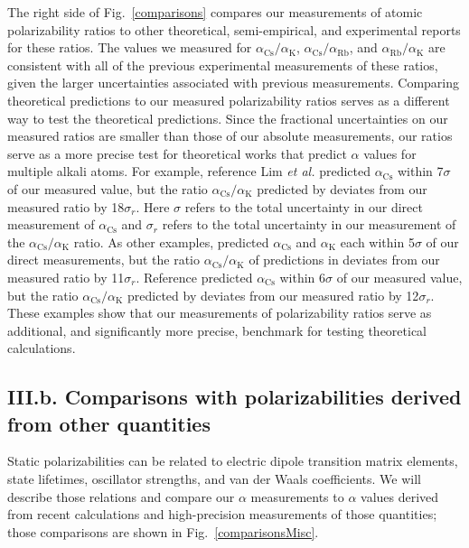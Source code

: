 \documentclass[twocolumn,prl,showpacs,superscriptaddress,longbibliography]{revtex4-1}   %
\newcommand{\figref}[1]{Fig.~\ref{#1}}
\newcommand{\ak}{\alpha_{\textrm{K}}}
\newcommand{\arb}{\alpha_{\textrm{Rb}}}
\newcommand{\acs}{\alpha_{\textrm{Cs}}}
\newcommand{\etal}{\textit{et al.}}
\begin{document}
The right side of \figref{comparisons} compares our measurements of atomic polarizability ratios to other theoretical, semi-empirical, and experimental reports for these ratios.  The values we measured for $\acs/\ak$, $\acs/\arb$, and $\arb/\ak$ are consistent with all of the previous experimental measurements of these ratios, given the larger uncertainties associated with previous measurements.  Comparing theoretical predictions to our measured polarizability ratios serves as a different way to test the theoretical predictions.  Since the fractional uncertainties on our measured ratios are smaller than those of our absolute measurements, our ratios serve as a more precise test for theoretical works that predict $\alpha$ values for multiple alkali atoms.  For example, reference Lim \etal \cite{Lim2005} predicted $\acs$ within 7$\sigma$ of our measured value, but the ratio $\acs/\ak$ predicted by \cite{Lim2005} deviates from our measured ratio by 18$\sigma_r$.   Here $\sigma$ refers to the total uncertainty in our direct measurement of $\acs$ and $\sigma_r$ refers to the total uncertainty in our measurement of the $\acs/\ak$ ratio.  As other examples, \cite{Fuentealba1999} predicted $\acs$ and $\ak$ each within 5$\sigma$ of our direct measurements, but the ratio $\acs/\ak$ of predictions in \cite{Fuentealba1999} deviates from our measured ratio by 11$\sigma_r$. Reference \cite{Y.-B.2014} predicted $\acs$ within 6$\sigma$ of our measured value, but the ratio $\acs/\ak$ predicted by \cite{Y.-B.2014} deviates from our measured ratio by 12$\sigma_r$.   These examples show that our measurements of polarizability ratios serve as additional, and significantly more precise, benchmark for testing theoretical calculations.




\subsection{III.b. Comparisons with polarizabilities derived from other quantities}

Static polarizabilities can be related to electric dipole transition matrix elements, state lifetimes, oscillator strengths, and van der Waals coefficients. We will describe those relations and compare our $\alpha$ measurements to $\alpha$ values derived from recent calculations and high-precision measurements of those quantities; those comparisons are shown in \figref{comparisonsMisc}.
\end{document}
